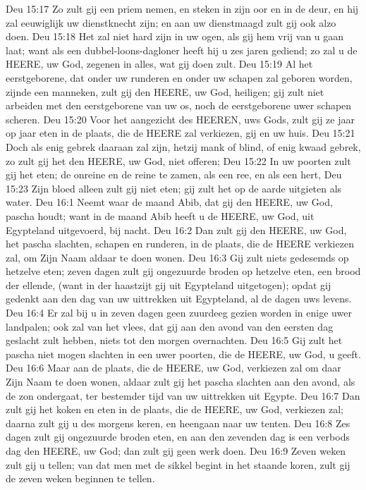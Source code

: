 Deu 15:17  Zo zult gij een priem nemen, en steken in zijn oor en in de deur, en hij zal eeuwiglijk uw dienstknecht zijn; en aan uw dienstmaagd zult gij ook alzo doen.
Deu 15:18  Het zal niet hard zijn in uw ogen, als gij hem vrij van u gaan laat; want als een dubbel-loons-dagloner heeft hij u zes jaren gediend; zo zal u de HEERE, uw God, zegenen in alles, wat gij doen zult.
Deu 15:19  Al het eerstgeborene, dat onder uw runderen en onder uw schapen zal geboren worden, zijnde een manneken, zult gij den HEERE, uw God, heiligen; gij zult niet arbeiden met den eerstgeborene van uw os, noch de eerstgeborene uwer schapen scheren.
Deu 15:20  Voor het aangezicht des HEEREN, uws Gods, zult gij ze jaar op jaar eten in de plaats, die de HEERE zal verkiezen, gij en uw huis.
Deu 15:21  Doch als enig gebrek daaraan zal zijn, hetzij mank of blind, of enig kwaad gebrek, zo zult gij het den HEERE, uw God, niet offeren;
Deu 15:22  In uw poorten zult gij het eten; de onreine en de reine te zamen, als een ree, en als een hert,
Deu 15:23  Zijn bloed alleen zult gij niet eten; gij zult het op de aarde uitgieten als water.
Deu 16:1  Neemt waar de maand Abib, dat gij den HEERE, uw God, pascha houdt; want in de maand Abib heeft u de HEERE, uw God, uit Egypteland uitgevoerd, bij nacht.
Deu 16:2  Dan zult gij den HEERE, uw God, het pascha slachten, schapen en runderen, in de plaats, die de HEERE verkiezen zal, om Zijn Naam aldaar te doen wonen.
Deu 16:3  Gij zult niets gedesemds op hetzelve eten; zeven dagen zult gij ongezuurde broden op hetzelve eten, een brood der ellende, (want in der haastzijt gij uit Egypteland uitgetogen); opdat gij gedenkt aan den dag van uw uittrekken uit Egypteland, al de dagen uws levens.
Deu 16:4  Er zal bij u in zeven dagen geen zuurdeeg gezien worden in enige uwer landpalen; ook zal van het vlees, dat gij aan den avond van den eersten dag geslacht zult hebben, niets tot den morgen overnachten.
Deu 16:5  Gij zult het pascha niet mogen slachten in een uwer poorten, die de HEERE, uw God, u geeft.
Deu 16:6  Maar aan de plaats, die de HEERE, uw God, verkiezen zal om daar Zijn Naam te doen wonen, aldaar zult gij het pascha slachten aan den avond, als de zon ondergaat, ter bestemder tijd van uw uittrekken uit Egypte.
Deu 16:7  Dan zult gij het koken en eten in de plaats, die de HEERE, uw God, verkiezen zal; daarna zult gij u des morgens keren, en heengaan naar uw tenten.
Deu 16:8  Zes dagen zult gij ongezuurde broden eten, en aan den zevenden dag is een verbods dag den HEERE, uw God; dan zult gij geen werk doen.
Deu 16:9  Zeven weken zult gij u tellen; van dat men met de sikkel begint in het staande koren, zult gij de zeven weken beginnen te tellen.
